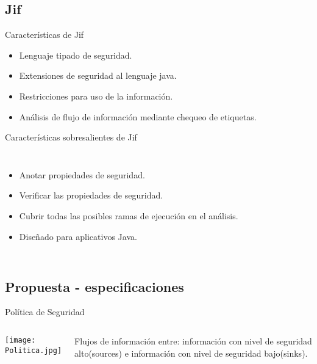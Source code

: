 \subsection{Jif}
\begin{frame}{Características de Jif}
\begin{itemize}
  \item Lenguaje tipado de seguridad.
  \item Extensiones de seguridad al lenguaje java.
  \item Restricciones para uso de la información.
  \item Análisis de flujo de información mediante chequeo de etiquetas.
\end{itemize}
\end{frame}
\begin{frame}[fragile]{Características sobresalientes de Jif}
\begin{columns}[T]
\column{2in}
	\begin{itemize}
	  \item Anotar propiedades de seguridad.
	  \item Verificar las propiedades de seguridad.
	  \item Cubrir todas las posibles ramas de ejecución en el análisis.
	  \item Diseñado para aplicativos Java.
	\end{itemize}
	

\end{columns}
\end{frame}

\subsection{Propuesta - especificaciones}
\begin{frame}{}

\end{frame}


















\begin{frame}{Política de Seguridad}
	\begin{columns}[c]
	\column{1.5in}
	\begin{center}
	\texttt{[image: Politica.jpg]} 
	\end{center}
	\column{1.5in}
	Flujos de información entre: información con nivel de seguridad alto(sources) e
	información con nivel de seguridad bajo(sinks).
	\end{columns}
\end{frame}


